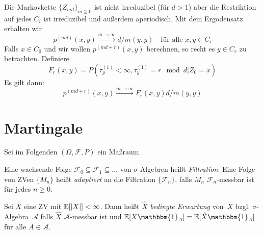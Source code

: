 \documentclass{cheat-sheet}
\newcommand{\E}{\mathbb{E}} %
\newcommand{\ind}{\mathbbm{1}} %
\newcommand{\iid}{i.\,i.\,d.} %
\begin{document}
\begin{bem}
  Die Markovkette $\{ Z_{md} \}_{m \geq 0}$ ist nicht irreduzibel (für $d > 1$) aber die Restriktion auf jedes $C_i$ ist irreduzibel und außerdem aperiodisch.
  Mit dem Ergodensatz erhalten wir
  \[
    p^{(md)}(x, y) \xrightarrow{m \to \infty} d / m(y, y)
    \quad \text{für alle $x, y \in C_i$}
  \]
  Falls $x \in C_0$ und wir wollen $p^{(md + r)}(x, y)$ berechnen, so recht es $y \in C_r$ zu betrachten.
  Definiere
  \[
    F_r(x, y) = P(\tau_y^{(1)} < \infty, \tau_y^{(1)} = r \mod d | Z_0 = x)
  \]
  Es gilt dann:
  \[
    p^{(md+r)}(x, y) \xrightarrow{m \to \infty} F_r(x, y) d / m(y, y)
  \]
\end{bem}


\section{Martingale}


Sei im Folgenden $(\Omega, \mathcal{F}, P)$ ein Maßraum.

\begin{defn}
  Eine wachsende Folge $\mathcal{F}_0 \subseteq \mathcal{F}_1 \subseteq \ldots$ von $\sigma$-Algebren heißt \emph{Filtration}.
  Eine Folge von ZVen $\{ M_n \}$ heißt \emph{adaptiert} an die Filtration $\{ \mathcal{F}_n \}$, falls $M_n$ $\mathcal{F}_n$-messbar ist für jedes $n \geq 0$.
\end{defn}

\begin{defn}
  Sei $X$ eine ZV mit $\E[\abs{X}] < \infty$.
  Dann heißt $\widehat{X}$ \emph{bedingte Erwartung} von~$X$ bzgl. $\sigma$-Algebra~$\mathcal{A}$ falls
  $\hat{X}$ $\mathcal{A}$-messbar ist und $\E[X \ind_A] = \E[\hat{X} \ind_A]$ für alle $A \in \mathcal{A}$.
\end{defn}
\end{document}
